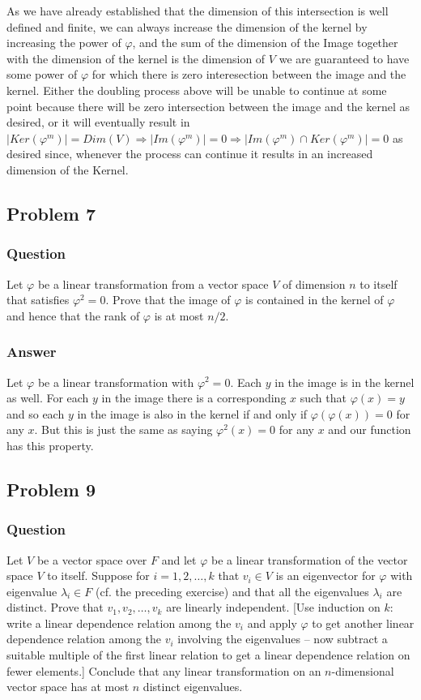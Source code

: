 \documentclass[12pt]{article}
\begin{document}
As we have already established that the dimension of this intersection is well defined and finite, we can always increase the dimension of the kernel by increasing the power of $\varphi$, and the sum of the dimension of the Image together with the dimension of the kernel is the dimension of $V$ we are guaranteed to have some power of $\varphi$ for which there is zero interesection between the image and the kernel. Either the doubling process above will be unable to continue at some point because there will be zero intersection between the image and the kernel as desired, or it will eventually result in $|Ker(\varphi^m)|=Dim(V) \Rightarrow |Im(\varphi^m)|= 0 \Rightarrow |Im(\varphi^m) \cap Ker(\varphi^m) | = 0$ as desired since, whenever the process can continue it results in an increased dimension of the Kernel.



\subsection{Problem 7}

\subsubsection{Question}
Let $\varphi$ be a linear transformation from a vector space $V$ of dimension $n$ to itself that satisfies $\varphi^2=0$. Prove that the image of $\varphi$ is contained in the kernel of $\varphi$ and hence that the rank of $\varphi$ is at most $n/2$. 
\subsubsection{Answer}
Let $\varphi$ be a linear transformation with $\varphi^2=0$. Each $y$ in the image is in the kernel as well. For each $y$ in the image there is a corresponding $x$ such that $\varphi(x) = y$ and so each $y$ in the image is also in the kernel if and only if $\varphi(\varphi(x))= 0$ for any $x$. But this is just the same as saying $\varphi^2(x)=0$  for any $x$ and our function has this property.


\subsection{Problem 9}

\subsubsection{Question}
Let $V$ be a vector space over $F$ and let $\varphi$ be a linear transformation of the vector space $V$ to itself. Suppose for $i = 1,2,\dots,k$ that $v_i \in V$ is an eigenvector for $\varphi$ with eigenvalue $\lambda_i \in F$ (cf. the preceding exercise) and that all the eigenvalues $\lambda_i$ are distinct. Prove that $v_1, v_2, \dots, v_k$ are linearly independent. [Use induction on $k$: write a linear dependence relation among the $v_i$ and apply $\varphi$ to get another linear dependence relation among the $v_i$ involving the eigenvalues -- now subtract a suitable multiple of the first linear relation to get a linear dependence relation on fewer elements.] Conclude that any linear transformation on an $n$-dimensional vector space has at most $n$ distinct eigenvalues.
\end{document}
